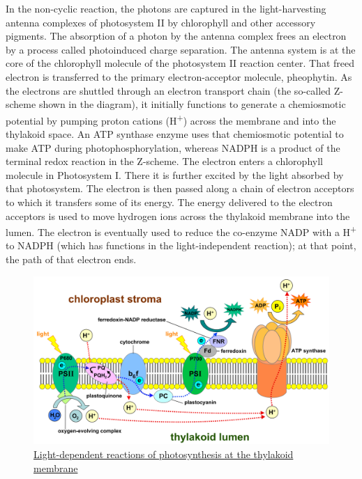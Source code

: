 In the non-cyclic reaction, the photons are captured in the light-harvesting antenna complexes of photosystem II by chlorophyll and other accessory pigments. The absorption of a photon by the antenna complex frees an electron by a process called photoinduced charge separation. The antenna system is at the core of the chlorophyll molecule of the photosystem II reaction center. That freed electron is transferred to the primary electron-acceptor molecule, pheophytin. As the electrons are shuttled through an electron transport chain (the so-called Z-scheme shown in the diagram), it initially functions to generate a chemiosmotic potential by pumping proton cations (H\textsuperscript{+}) across the membrane and into the thylakoid space. An ATP synthase enzyme uses that chemiosmotic potential to make ATP during photophosphorylation, whereas NADPH is a product of the terminal redox reaction in the Z-scheme. The electron enters a chlorophyll molecule in Photosystem I. There it is further excited by the light absorbed by that photosystem. The electron is then passed along a chain of electron acceptors to which it transfers some of its energy. The energy delivered to the electron acceptors is used to move hydrogen ions across the thylakoid membrane into the lumen. The electron is eventually used to reduce the co-enzyme NADP with a H\textsuperscript{+} to NADPH (which has functions in the light-independent reaction); at that point, the path of that electron ends.



\begin{figure}

{\centering \includegraphics[width=0.7\linewidth]{./figures/photosynthesis/Thylakoid_membrane_3} 

}

\caption{\href{https://commons.wikimedia.org/wiki/File:Thylakoid_membrane_3.svg}{Light-dependent reactions of photosynthesis at the thylakoid membrane}}\label{fig:lightdependent}
\end{figure}

